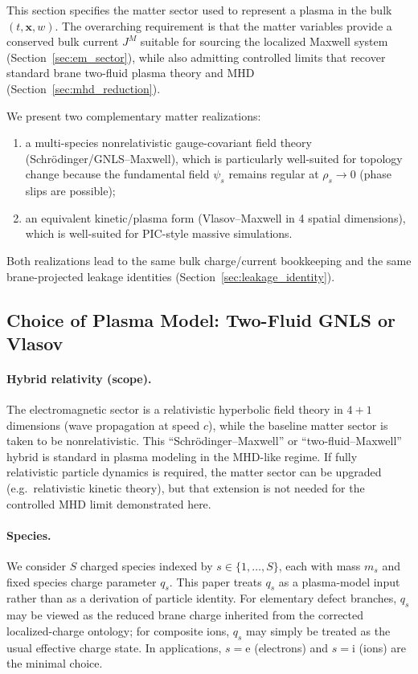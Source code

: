 \documentclass[11pt]{article}
\newcommand{\x}{\mathbf{x}}     %
\newcommand{\J}{J}              %
\newcommand{\ion}{\mathrm{i}}
\newcommand{\ele}{\mathrm{e}}
\begin{document}
This section specifies the matter sector used to represent a plasma in the bulk
\((t,\x,w)\). The overarching requirement is that the matter variables provide a
conserved bulk current \(\J^M\) suitable for sourcing the localized Maxwell system
(Section~\ref{sec:em_sector}), while also admitting controlled limits that recover
standard brane two-fluid plasma theory and MHD (Section~\ref{sec:mhd_reduction}).

We present two complementary matter realizations:
\begin{enumerate}[leftmargin=1.6em]
\item a multi-species nonrelativistic gauge-covariant field theory (Schr\"odinger/GNLS--Maxwell),
which is particularly well-suited for topology change because the fundamental
field \(\psi_s\) remains regular at \(\rho_s\to 0\) (phase slips are possible);
\item an equivalent kinetic/plasma form (Vlasov--Maxwell in 4 spatial dimensions),
which is well-suited for PIC-style massive simulations.
\end{enumerate}
Both realizations lead to the same bulk charge/current bookkeeping and the same
brane-projected leakage identities (Section~\ref{sec:leakage_identity}).

\subsection{Choice of Plasma Model: Two-Fluid GNLS or Vlasov}
\label{sec:plasma_choice}

\paragraph{Hybrid relativity (scope).}
The electromagnetic sector is a relativistic hyperbolic field theory in \(4+1\)
dimensions (wave propagation at speed \(c\)), while the baseline matter sector is
taken to be nonrelativistic. This ``Schr\"odinger--Maxwell'' or ``two-fluid--Maxwell''
hybrid is standard in plasma modeling in the MHD-like regime. If fully relativistic
particle dynamics is required, the matter sector can be upgraded (e.g.\ relativistic
kinetic theory), but that extension is not needed for the controlled MHD limit
demonstrated here.

\paragraph{Species.}
We consider \(S\) charged species indexed by \(s\in\{1,\ldots,S\}\), each with
mass \(m_s\) and fixed species charge parameter \(q_s\). This paper treats \(q_s\)
as a plasma-model input rather than as a derivation of particle identity. For
elementary defect branches, \(q_s\) may be viewed as the reduced brane charge
inherited from the corrected localized-charge ontology; for composite ions,
\(q_s\) may simply be treated as the usual effective charge state. In
applications, \(s=\ele\) (electrons) and \(s=\ion\) (ions) are the minimal choice.
\end{document}
